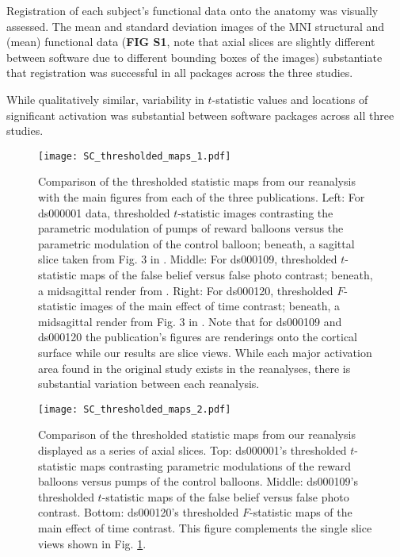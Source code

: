Registration of each subject's functional data onto the anatomy was visually assessed. The mean and standard deviation images of the MNI structural and (mean) functional data (\textbf{FIG S1}, note that axial slices are slightly different between software due to different bounding boxes of the images) substantiate that registration was successful in all packages across the three studies. 

While qualitatively similar, variability in $t$-statistic values and locations of significant activation was substantial between software packages across all three studies. 

\begin{figure}[htbp]
\centering
	\texttt{[image: SC\_thresholded\_maps\_1.pdf]}	
\caption{Comparison of the thresholded statistic maps from our reanalysis with the main figures from each of the three publications. Left: For ds000001 data, thresholded $t$-statistic images contrasting the parametric modulation of pumps of reward balloons versus the parametric modulation of the control balloon; beneath, a sagittal slice taken from Fig. 3 in \citet{Schonberg2012-oo}. Middle: For ds000109, thresholded $t$-statistic maps of the false belief versus false photo contrast; beneath, a midsagittal render from \citet{Moran2012-cw}. Right: For ds000120, thresholded $F$-statistic images of the main effect of time contrast; beneath, a midsagittal render from Fig. 3 in \citet{Padmanabhan2011-dc}. Note that for ds000109 and ds000120 the publication's figures are renderings onto the cortical surface while our results are slice views. While each major activation area found in the original study exists in the reanalyses, there is substantial variation between each reanalysis.}
\label{fig:SC_thresholded_maps_1}
\end{figure}

\begin{figure}[htbp]
\centering
	\texttt{[image: SC\_thresholded\_maps\_2.pdf]}	
\caption{Comparison of the thresholded statistic maps from our reanalysis displayed as a series of axial slices. Top: ds000001's thresholded $t$-statistic maps contrasting parametric modulations of the reward balloons versus pumps of the control balloons. Middle: ds000109's thresholded $t$-statistic maps of the false belief versus false photo contrast. Bottom: ds000120's thresholded $F$-statistic maps of the main effect of time contrast. This figure complements the single slice views shown in Fig. \ref{fig:SC_thresholded_maps_1}.}
\label{fig:SC_thresholded_maps_2}
\end{figure}

